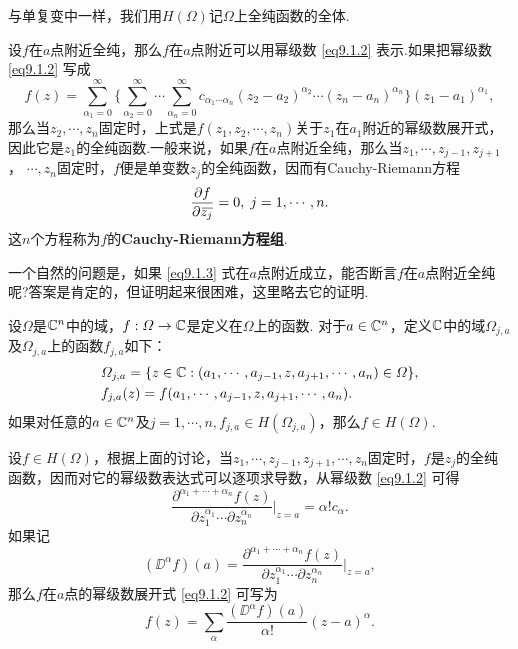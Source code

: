 与单复变中一样，我们用$H(\Omega)$记$\Omega$上全纯函数的全体.

设$f$在$a$点附近全纯，那么$f$在$a$点附近可以用幂级数 \eqref{eq9.1.2} 表示.如果把幂级数 \eqref{eq9.1.2} 写成
\[f(z)=\sum_{\alpha_1=0}^\infty\bigg\{\sum_{\alpha_2=0}^\infty\cdots
\sum_{\alpha_n=0}^\infty c_{\alpha_1\cdots\alpha_n}(z_2-a_2)^{\alpha_2}\cdots(z_n-a_n)^{\alpha_n}\bigg\}
(z_1-a_1)^{\alpha_1},\]
那么当$z_2,\cdots,z_n$固定时，上式是$f(z_1,z_2,\cdots,z_n)$关于$z_1$在$a_1$附近的幂级数展开式，因此它是$z_1$的全纯函数.一般来说，如果$f$在$a$点附近全纯，那么当$z_1,\cdots,z_{j-1},z_{j+1}$， $\cdots,z_n$固定时，$f$便是单变数$z_j$的全纯函数，因而有Cauchy-Riemann方程
\begin{equation}\label{eq9.1.3}
\frac{\partial f}{\partial {}\mkern2mu\overline{\mkern-2muz_j}}=0,\;j=1,\cdots,n.
\end{equation}
这$n$个方程称为$f$的\textbf{Cauchy-Riemann方程组}.

一个自然的问题是，如果 \eqref{eq9.1.3} 式在$a$点附近成立，能否断言$f$在$a$点附近全纯呢?答案是肯定的，但证明起来很困难，这里略去它的证明.
\begin{theorem}\label{thm9.1.3}
设$\Omega$是$\mathbb C^n$中的域，$f:\varOmega\to\mathbb C$是定义在$\Omega$上的函数. 对于$a\in\mathbb C^n$，定义$\mathbb C$中的域$\Omega_{j,a}$及$\Omega_{j,a}$上的函数$f_{j,a}$如下：
\begin{align*}
&\varOmega_{j,a}=\{z\in\mathbb C:(a_1,\cdots,a_{j-1},z,a_{j+1},\cdots,a_n)\in\varOmega\},\\
&f_{j,a}(z)=f(a_1,\cdots,a_{j-1},z,a_{j+1},\cdots,a_n).
\end{align*}
如果对任意的$a\in\mathbb C^n$及$j=1,\cdots,n,f_{j,a}\in H(\Omega_{j,a})$，那么$f\in H(\Omega)$.
\end{theorem}

设$f\in H(\Omega)$，根据上面的讨论，当$z_1,\cdots,z_{j-1},z_{j+1},\cdots,z_n$固定时，$f$是$z_j$的全纯函数，因而对它的幂级数表达式可以逐项求导数，从幂级数 \eqref{eq9.1.2} 可得
\[\frac{\partial^{\alpha_1+\cdots+\alpha_n}f(z)}{\partial z_1^{\alpha_1}
\cdots\partial z_n^{\alpha_n}}\bigg|_{z=a}=\alpha!c_\alpha.\]
如果记
\[(\DD^\alpha f)(a)=\frac{\partial^{\alpha_1+\cdots+\alpha_n}f(z)}{\partial z_1^{\alpha_1}
\cdots\partial z_n^{\alpha_n}}\bigg|_{z=a},\]
那么$f$在$a$点的幂级数展开式 \eqref{eq9.1.2} 可写为
\[f(z)=\sum_\alpha\frac{(\DD^\alpha f)(a)}{\alpha!}(z-a)^\alpha.\]

